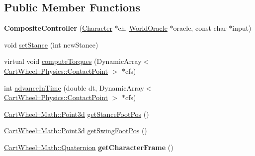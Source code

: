 \subsection*{Public Member Functions}
\begin{DoxyCompactItemize}
\item 
\hypertarget{classCartWheel_1_1Core_1_1CompositeController_ab97b06b17d8eae65b93611b13d235701}{
{\bfseries CompositeController} (\hyperlink{classCartWheel_1_1Core_1_1Character}{Character} $\ast$ch, \hyperlink{classCartWheel_1_1Core_1_1WorldOracle}{WorldOracle} $\ast$oracle, const char $\ast$input)}
\label{classCartWheel_1_1Core_1_1CompositeController_ab97b06b17d8eae65b93611b13d235701}

\item 
void \hyperlink{classCartWheel_1_1Core_1_1CompositeController_a59a7bcf071ceb4b136a0842e5379127c}{setStance} (int newStance)
\item 
virtual void \hyperlink{classCartWheel_1_1Core_1_1CompositeController_a03b84a4f22ace37730af71e63ab765cd}{computeTorques} (DynamicArray$<$ \hyperlink{classCartWheel_1_1Physics_1_1ContactPoint}{CartWheel::Physics::ContactPoint} $>$ $\ast$cfs)
\item 
int \hyperlink{classCartWheel_1_1Core_1_1CompositeController_a0f8ff764e329d06f72dd2ba756e6aed1}{advanceInTime} (double dt, DynamicArray$<$ \hyperlink{classCartWheel_1_1Physics_1_1ContactPoint}{CartWheel::Physics::ContactPoint} $>$ $\ast$cfs)
\item 
\hyperlink{classCartWheel_1_1Math_1_1Point3d}{CartWheel::Math::Point3d} \hyperlink{classCartWheel_1_1Core_1_1CompositeController_ac9116608597803a4adf905f78670f621}{getStanceFootPos} ()
\item 
\hyperlink{classCartWheel_1_1Math_1_1Point3d}{CartWheel::Math::Point3d} \hyperlink{classCartWheel_1_1Core_1_1CompositeController_a3e436fc94001645ccfc699513260a25b}{getSwingFootPos} ()
\item 
\hypertarget{classCartWheel_1_1Core_1_1CompositeController_aae48c917a58225c04d1088c94cfdd8a8}{
\hyperlink{classCartWheel_1_1Math_1_1Quaternion}{CartWheel::Math::Quaternion} {\bfseries getCharacterFrame} ()}
\label{classCartWheel_1_1Core_1_1CompositeController_aae48c917a58225c04d1088c94cfdd8a8}


\end{DoxyCompactItemize}
